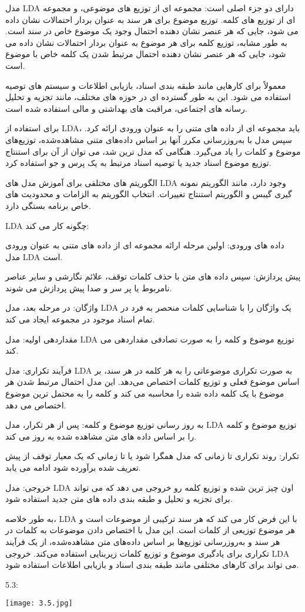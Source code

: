 مدل LDA دارای دو جزء اصلی است: مجموعه ای از توزیع های موضوعی، و مجموعه ای از توزیع های کلمه. توزیع موضوع برای هر سند به عنوان بردار احتمالات نشان داده می شود، جایی که هر عنصر نشان دهنده احتمال وجود یک موضوع خاص در سند است. به طور مشابه، توزیع کلمه برای هر موضوع به عنوان بردار احتمالات نشان داده می شود، جایی که هر عنصر نشان دهنده احتمال مرتبط شدن یک کلمه خاص با موضوع است.

 معمولاً برای کارهایی مانند طبقه بندی اسناد، بازیابی اطلاعات و سیستم های توصیه استفاده می شود. این به طور گسترده ای در حوزه های مختلف، مانند تجزیه و تحلیل رسانه های اجتماعی، مراقبت های بهداشتی و مالی استفاده شده است.

برای استفاده از LDA، باید مجموعه ای از داده های متنی را به عنوان ورودی ارائه کرد. سپس مدل با به‌روزرسانی مکرر آنها بر اساس داده‌های متنی مشاهده‌شده، توزیع‌های موضوع و کلمات را یاد می‌گیرد. هنگامی که مدل ترین شد، می توان از آن برای استنتاج توزیع موضوع اسناد جدید یا توصیه اسناد مرتبط به یک پرس و جو استفاده کرد.

الگوریتم های مختلفی برای آموزش مدل های LDA وجود دارد، مانند الگوریتم نمونه گیری گیبس و الگوریتم استنتاج تغییرات. انتخاب الگوریتم به الزامات و محدودیت های خاص برنامه بستگی دارد.

LDA چگونه کار می کند:

داده های ورودی: اولین مرحله ارائه مجموعه ای از داده های متنی به عنوان ورودی مدل LDA است.

پیش پردازش: سپس داده های متن با حذف کلمات توقف، علائم نگارشی و سایر عناصر نامربوط یا پر سر و صدا پیش پردازش می شوند.

واژگان: در مرحله بعد، مدل LDA یک واژگان را با شناسایی کلمات منحصر به فرد در تمام اسناد موجود در مجموعه ایجاد می کند.

مقداردهی اولیه: مدل LDA توزیع موضوع و کلمه را به صورت تصادفی مقداردهی می کند.

فرآیند تکراری: مدل LDA به صورت تکراری موضوعاتی را به هر کلمه در هر سند، بر اساس موضوع فعلی و توزیع کلمات اختصاص می‌دهد. این مدل احتمال مرتبط شدن هر موضوع با یک کلمه داده شده را محاسبه می کند و کلمه را به محتمل ترین موضوع اختصاص می دهد.

به روز رسانی توزیع موضوع و کلمه: پس از هر تکرار، مدل LDA توزیع موضوع و کلمه را بر اساس داده های متن مشاهده شده به روز می کند.

تکرار: روند تکراری تا زمانی که مدل همگرا شود یا تا زمانی که یک معیار توقف از پیش تعریف شده برآورده شود ادامه می یابد.

خروجی: مدل LDA اون چیز ترین شده و توزیع کلمه رو خروجی می دهد که می تواند برای تجزیه و تحلیل و طبقه بندی داده های متن جدید استفاده شود.

به طور خلاصه، LDA با این فرض کار می کند که هر سند ترکیبی از موضوعات است و هر موضوع توزیعی از کلمات است. این مدل با اختصاص دادن موضوعات به کلمات در هر سند و به‌روزرسانی توزیع‌ها بر اساس داده‌های متن مشاهده‌شده، از یک فرآیند تکراری برای یادگیری موضوع و توزیع کلمات زیربنایی استفاده می‌کند. خروجی LDA می تواند برای کارهای مختلفی مانند طبقه بندی اسناد و بازیابی اطلاعات استفاده شود.

5.3:
\begin{center}
    \texttt{[image: 3.5.jpg]}
\end{center}
